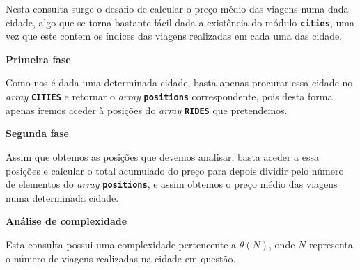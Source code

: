 \documentclass[12pt,a4paper]{report}
\begin{document}
Nesta consulta surge o desafio de calcular o preço médio das viagens numa dada cidade, algo que se torna bastante fácil dada a existência do módulo \textbf{\small\texttt{cities}}, uma vez que este contem os índices das viagens realizadas em cada uma das cidade.

\normalsize\textbf{Primeira fase }{\titlerule[0.5pt]}

Como nos é dada uma determinada cidade, basta apenas procurar essa cidade no \textit{array} \textbf{\small\texttt{CITIES}} e retornar o \textit{array} \textbf{\small\texttt{positions}} correspondente, pois desta forma apenas iremos aceder à posições do \textit{array} \textbf{\small\texttt{RIDES}} que pretendemos.

\normalsize\textbf{Segunda fase }{\titlerule[0.5pt]}

Assim que obtemos as posições que devemos analisar, basta aceder a essa posições e calcular o total acumulado do preço para depois dividir pelo número de elementos do \textit{array} \textbf{\small\texttt{positions}}, e assim obtemos o preço médio das viagens numa determinada cidade.

\normalsize\textbf{Análise de complexidade }{\titlerule[0.5pt]}

Esta consulta possui uma complexidade pertencente a \(\theta(N)\), onde \(N\) representa o número de viagens realizadas na cidade em questão.
\end{document}
